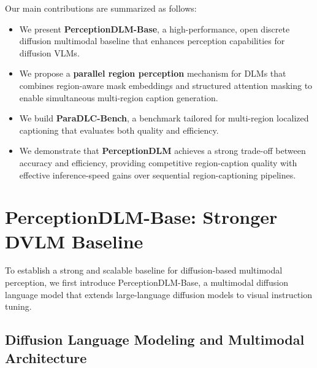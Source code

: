 \documentclass{llmxive}
\begin{document}
%
Our main contributions are summarized as follows:
%
\begin{itemize}
    \item We present \textbf{PerceptionDLM-Base}, a high-performance, open discrete diffusion multimodal baseline that enhances perception capabilities for diffusion VLMs.
    \item We propose a \textbf{parallel region perception} mechanism for DLMs that combines region-aware mask embeddings and structured attention masking to enable simultaneous multi-region caption generation.
    \item We build \textbf{ParaDLC-Bench}, a benchmark tailored for multi-region localized captioning that evaluates both quality and efficiency.
    \item We demonstrate that \textbf{PerceptionDLM} achieves a strong trade-off between accuracy and efficiency, providing competitive region-caption quality with effective inference-speed gains over sequential region-captioning pipelines.
\end{itemize}
\vspace{-3mm}
\section{PerceptionDLM-Base: Stronger DVLM Baseline}

To establish a strong and scalable baseline for diffusion-based multimodal perception, we first introduce PerceptionDLM-Base, a multimodal diffusion language model that extends large-language diffusion models to visual instruction tuning. 

\subsection{Diffusion Language Modeling and Multimodal Architecture}
\end{document}
